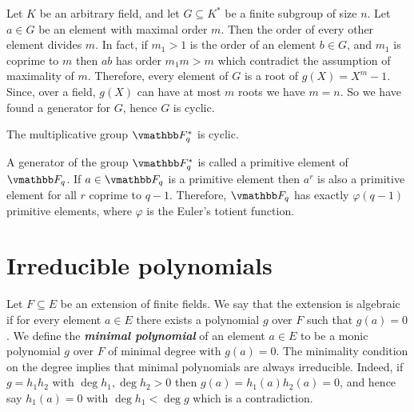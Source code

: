 Let $K$ be an arbitrary field, and let $G \subseteq K^*$ be a finite subgroup of size $n$. Let $a 
\in G$ be an element with maximal order $m$. Then the order of every other element divides $m$. In 
fact, if $m_1 > 1$ is the order of an element $b \in G$, and $m_1$ is coprime to $m$ then $ab$ has 
order $m_1m > m$ which contradict the assumption of maximality of $m$. Therefore, every element of 
$G$ is a root of $g(X) = X^m - 1$. Since, over a field, $g(X)$ can have at most $m$ roots we have 
$m = n$. So we have found a generator for $G$, hence $G$ is cyclic.
\begin{result}
	The multiplicative group $\F_q^*$ is cyclic.
\end{result}
A generator of the group $\F_q^*$ is called a primitive element of $\F_q$. If $a \in \F_q$ is a 
primitive element then $a^r$ is also a primitive element for all $r$ coprime to $q - 1$. 
Therefore, $\F_q$ has exactly $\varphi(q - 1)$ primitive elements, where $\varphi$ is the Euler's 
totient function. 


\section{Irreducible polynomials}

Let $F \subseteq E$ be an extension of finite fields. We say that the extension is algebraic if 
for every element $a \in E$ there exists a polynomial $g$ over $F$ such that $g(a) = 0$. We define 
the \textit{\textbf{minimal polynomial}} of an element $a \in E$ to be a monic polynomial $g$ over 
$F$ of minimal degree with $g(a) = 0$. The minimality condition on the degree implies that minimal 
polynomials are always irreducible. Indeed, if $g = h_1h_2$ with $\deg h_1, \deg h_2 > 0$ then 
$g(a) = h_1(a)h_2(a) = 0$, and hence say $h_1(a) = 0$ with $\deg h_1 < \deg g$ which is a 
contradiction. 

